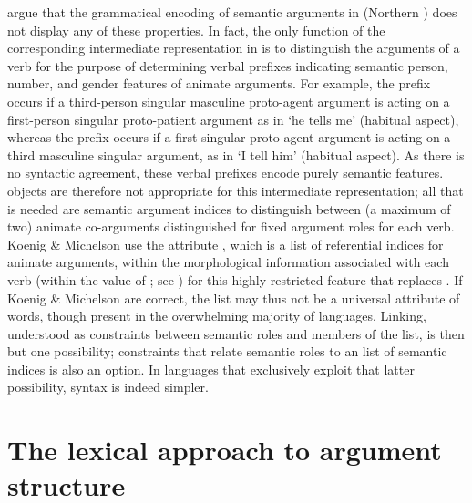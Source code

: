 \documentclass[output=paper
 	        ,biblatex
                ,babelshorthands
                ,newtxmath
                ,draftmode
                ,colorlinks, citecolor=brown
]{langscibook}
\begin{document}
\noindent
\citet{KoenigandMichelson2014,KoenigandMichelson2015a,KoenigandMichelson2015b} argue that the grammatical encoding of semantic arguments in  (Northern )  does not display any of these properties.  In fact, the only function of the
corresponding intermediate representation in  is to distinguish
the arguments of a verb for the purpose of determining verbal
prefixes indicating semantic person, number, and gender
features of animate arguments.  
For example,  the prefix  occurs if a third-person singular masculine proto-agent argument is acting on a first-person singular proto-patient argument as in   `he tells me’ (habitual aspect), whereas  the prefix  occurs if a first singular proto-agent argument is acting on a third masculine singular argument, as in  `I tell him’ (habitual aspect).
 As there is no syntactic agreement, these verbal prefixes encode purely semantic features.
 objects are therefore not appropriate for this intermediate
representation; all that is needed are semantic argument indices to
distinguish between (a maximum of two) animate co-arguments
distinguished for fixed argument roles for each verb.
Koenig \& Michelson use the attribute , which is a list of referential indices for animate arguments, within the morphological information associated with each verb (within the value of ; see )
 for this highly restricted
 feature that replaces \argst. If Koenig \& Michelson are correct, the \argst list may thus not be a universal attribute of words, though present in the overwhelming majority of languages.
Linking, understood as constraints between semantic roles and members of the \argst list, is then but one possibility; constraints that relate semantic roles to an  list of semantic indices is also an option.
In languages that exclusively exploit that latter possibility, syntax is indeed simpler.



\section{The lexical approach to argument structure}
\label{lexicalapproach}
\end{document}
